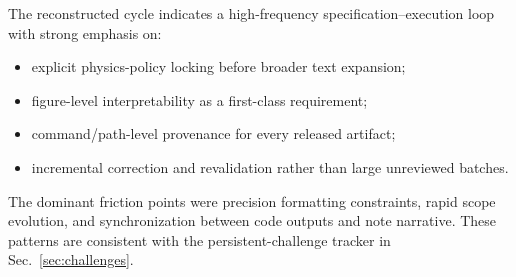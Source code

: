The reconstructed cycle indicates a high-frequency specification--execution loop with strong emphasis on:
\begin{itemize}
\item explicit physics-policy locking before broader text expansion;
\item figure-level interpretability as a first-class requirement;
\item command/path-level provenance for every released artifact;
\item incremental correction and revalidation rather than large unreviewed batches.
\end{itemize}

The dominant friction points were precision formatting constraints, rapid scope evolution, and synchronization between code outputs and note narrative. These patterns are consistent with the persistent-challenge tracker in Sec.~\ref{sec:challenges}.

